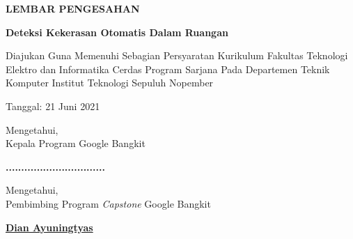 \begin{center}
  {\Large \textbf{LEMBAR PENGESAHAN}}
  \vspace{6ex}


  {\large \textbf{Deteksi Kekerasan Otomatis Dalam Ruangan}}
  \vspace{6ex}

  Diajukan Guna Memenuhi Sebagian Persyaratan Kurikulum Fakultas Teknologi Elektro dan Informatika Cerdas Program Sarjana Pada Departemen Teknik Komputer Institut Teknologi Sepuluh Nopember
  \vspace{2ex}

  Tanggal: 21 Juni 2021

  \vspace{8ex}

  Mengetahui, \\
  Kepala Program Google Bangkit
  \vspace{12ex}

  \textbf{................................}
  \vspace{8ex}

  Mengetahui, \\
  Pembimbing Program \textit{Capstone} Google Bangkit
  \vspace{12ex}

  \textbf{\underline{Dian Ayuningtyas}}

  \vspace{8ex}

\end{center}
